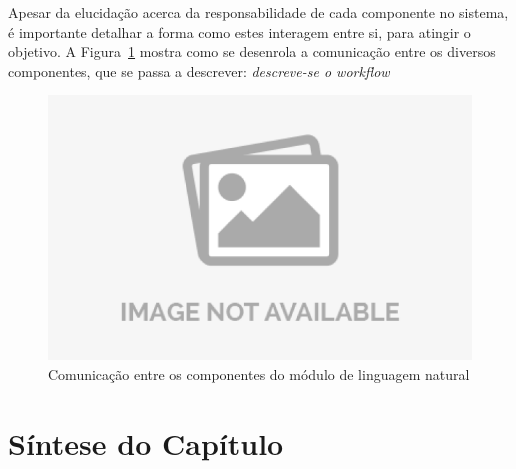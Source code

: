 Apesar da elucidação acerca da responsabilidade de cada componente no sistema, é importante detalhar a forma como estes interagem entre si, para atingir o objetivo. A Figura~\ref{fig:prototype_sequence_diagram} mostra como se desenrola a comunicação entre os diversos componentes, que se passa a descrever: \textit{descreve-se o workflow}

\begin{figure}
    \centering
    \includegraphics[width=\textwidth]{no-image.png}
    \caption{Comunicação entre os componentes do módulo de linguagem natural}
    \label{fig:prototype_sequence_diagram}
\end{figure}

\section{Síntese do Capítulo} 
\label{sec:chap04_chaptersummary}
\tbd
